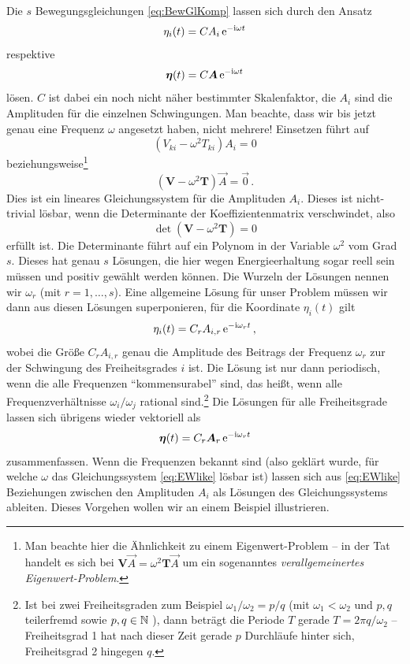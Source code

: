 \documentclass[paper=a4, fontsize=11.0pt, abstractoff, DIV12]{scrartcl}
\begin{document}
Die $s$ Bewegungsgleichungen \eqref{eq:BewGlKomp} lassen sich durch den Ansatz
\begin{equation}
\eta_i(t) = C A_i \,{\mathrm{e}}^{-\mathrm{i} \omega t}
\end{equation}
respektive
\begin{equation}
{\ensuremath{\boldsymbol{\eta}}}(t) = C {\boldsymbol{A}} \,{\mathrm{e}}^{-\mathrm{i} \omega t}
\end{equation}
lösen. $C$ ist dabei ein noch nicht näher bestimmter Skalenfaktor, die $A_i$
sind die Amplituden für die einzelnen Schwingungen. Man beachte, dass wir
bis jetzt genau eine Frequenz $\omega$ angesetzt haben, nicht mehrere!
Einsetzen führt auf
\begin{equation}
\left(V_{ki} - \omega^2 T_{ki} \right)A_i = 0
\end{equation}
beziehungsweise\footnote{Man beachte hier die Ähnlichkeit zu einem
Eigenwert-Problem -- in der Tat handelt es sich bei $\mathbf{V}\vec A =
\omega^2\mathbf{T}\vec A$ um ein sogenanntes \emph{verallgemeinertes
Eigenwert-Problem}.}
\begin{equation}
\left(\mathbf{V} - \omega^2\mathbf{T}\right)\vec{A} = \vec 0\, .
\label{eq:EWlike}
\end{equation}
Dies ist ein lineares Gleichungssystem für die Amplituden $A_i$. Dieses ist
nicht-trivial lösbar, wenn die Determinante der Koeffizientenmatrix
verschwindet, also
\begin{equation}
\det\left(\mathbf{V} - \omega^2\mathbf{T} \right) = 0
\label{eq:Det}
\end{equation}
erfüllt ist. Die Determinante führt auf ein Polynom in der Variable
$\omega^2$ vom Grad $s$. Dieses hat genau $s$ Lösungen, die hier wegen
Energieerhaltung sogar reell sein müssen und positiv gewählt werden können.
Die Wurzeln der Lösungen nennen wir $\omega_r$ (mit $r=1,\dots,s$). Eine
allgemeine Lösung für unser Problem müssen wir dann aus diesen Lösungen
superponieren, für die Koordinate $\eta_i(t)$ gilt
\begin{equation}
\eta_i(t) = C_r A_{i,r} \,{\mathrm{e}}^{-\mathrm{i} \omega_r t}\, ,
\label{eq:SchwingR}
\end{equation}
wobei die Größe $C_r A_{i,r}$ genau die Amplitude des Beitrags der Frequenz
$\omega_r$ zur der Schwingung des Freiheitsgrades $i$ ist. Die Lösung ist
nur dann periodisch, wenn die alle Frequenzen ``kommensurabel'' sind, das
heißt, wenn alle Frequenzverhältnisse $\omega_i/\omega_j$ rational
sind.\footnote{Ist bei zwei Freiheitsgraden zum Beispiel $\omega_1/\omega_2 = p/q$
(mit $\omega_1 < \omega_2$ und $p,q$ teilerfremd sowie $p,q \in \mathbb{N}$
), dann beträgt die Periode $T$ gerade $T=2\pi q/\omega_2$ -- Freiheitsgrad
1 hat nach dieser Zeit gerade $p$ Durchläufe hinter sich, Freiheitsgrad 2
hingegen $q$.} Die Lösungen für alle Freiheitsgrade lassen sich übrigens
wieder vektoriell als
\begin{equation}
{\ensuremath{\boldsymbol{\eta}}}(t) = C_r {\boldsymbol{A}}_r \,{\mathrm{e}}^{-\mathrm{i}\omega_r t}
\label{eq:BewLsg}
\end{equation}
zusammenfassen. Wenn die Frequenzen bekannt sind (also geklärt wurde, für
welche $\omega$ das Gleichungssystem \eqref{eq:EWlike} lösbar ist) lassen sich
aus \eqref{eq:EWlike} Beziehungen zwischen den Amplituden $A_i$ als Lösungen
des Gleichungssystems ableiten. Dieses Vorgehen wollen wir an einem Beispiel
illustrieren.
\end{document}
